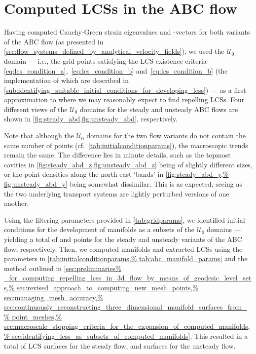 \section{Computed LCSs in the ABC flow}
\label{sec:computed_lcss_in_the_abc_flow}

Having computed Cauchy-Green strain eigenvalues and -vectors for both
variants of the ABC flow (as presented in
\cref{sec:flow_systems_defined_by_analytical_velocity_fields}), we used
the $\mathcal{U}_{0}$ domain --- i.e., the grid points satisfying the LCS
existence criteria~ \eqref{eq:lcs_condition_a},~\eqref{eq:lcs_condition_b}
and~\eqref{eq:lcs_condition_b} (the implementation of which are
described in
\cref{sub:identifying_suitable_initial_conditions_for_developing_lcss}) --- as
a first approximation to where we may reasonably expect to find repelling LCSs.
Four different views of the $\mathcal{U}_{0}$ domains for the steady
and unsteady ABC flows are shown in \cref{fig:steady_abd,fig:unsteady_abd},
respectively.





Note that although the $\mathcal{U}_{0}$ domains for the two
flow variants do not contain the same number of points (cf.\
\cref{tab:initialconditionparams}), the macroscopic trends remain the same. The
difference lies in minute details, such as the topmost cavities in
\cref{fig:steady_abd_z,fig:unsteady_abd_z} being of slightly different sizes,
or the point densities along the north east `bands' in \cref{fig:steady_abd_y,%
fig:unsteady_abd_y} being somewhat dissimilar. This is as expected, seeing
as the two underlying transport systems are lightly perturbed versions of
one another.

Using the filtering parameters provided in \cref{tab:gridparams}, we identified
initial conditions for the development of manifolds as a subsets of the
$\mathcal{U}_{0}$ domains --- yielding a total of \numprint{618} and
\numprint{676} points for the steady and unsteady variants of the ABC flow,
respectively.  Then, we computed manifolds and extracted LCSs using the
parameters in \cref{tab:initialconditionparams,%
tab:abc_manifold_params} and the method outlined in \cref{sec:preliminaries%
_for_computing_repelling_lcss_in_3d_flow_by_means_of_geodesic_level_sets,%
    sec:revised_approach_to_computing_new_mesh_points,%
    sec:managing_mesh_accuracy,%
    sec:continuously_reconstructing_three_dimensional_manifold_surfaces_from_%
    point_meshes,%
    sec:macroscale_stopping_criteria_for_the_expansion_of_computed_manifolds,%
    sec:identifying_lcss_as_subsets_of_computed_manifolds}. This resulted
in a total of \numprint{22} LCS surfaces for the steady flow, and
\numprint{31} surfaces for the unsteady flow.

